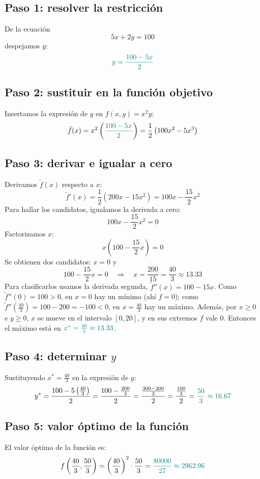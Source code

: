 \documentclass{article}
\begin{document}
\subsection*{Paso 1: resolver la restricción}
De la ecuación
\[
5x+2y=100
\]
despejamos \(y\):
\[\color{teal}
y=\frac{100-5x}{2}
\]
 
\subsection*{Paso 2: sustituir en la función objetivo}
Insertamos la expresión de \(y\) en \(f(x,y)=x^2y\):
\[
\tilde f(x)=x^2\left({\color{teal}\frac{100-5x}{2}}\right)=\frac{1}{2}\left(100x^2-5x^3\right)
\]
 
\subsection*{Paso 3: derivar e igualar a cero}
Derivamos \(\tilde f(x)\) respecto a \(x\):
\[
\tilde f'(x)=\frac{1}{2}\left(200x-15x^2\right)=100x-\frac{15}{2}x^2
\]
Para hallar los candidatos, igualamos la derivada a cero:
\[
100x-\frac{15}{2}x^2=0
\]
Factorizamos \(x\):
\[
x\left(100-\frac{15}{2}x\right)=0
\]
Se obtienen dos candidatos: \(x=0\) y
\[
100-\frac{15}{2}x=0 \quad\Longrightarrow\quad x=\frac{200}{15}=\frac{40}{3}\approx 13.33
\]
Para clasificarlos usamos la derivada segunda, \(\tilde f''(x)=100-15x\). Como \(\tilde f''(0)=100>0\), en \(x=0\) hay un mínimo (ahí \(f=0\)); como \(\tilde f''\!\left(\frac{40}{3}\right)=100-200=-100<0\), en \(x=\frac{40}{3}\) hay un máximo. Además, por \(x\geq 0\) e \(y\geq 0\), \(x\) se mueve en el intervalo \([0,20]\), y en sus extremos \(f\) vale \(0\). Entonces el máximo está en \(\color{teal}x^*=\frac{40}{3}\approx 13.33\).
 
\subsection*{Paso 4: determinar \(y\)}
Sustituyendo \(x^*=\frac{40}{3}\) en la expresión de \(y\):
\[
y^*=\frac{100-5\left(\frac{40}{3}\right)}{2}=\frac{100-\frac{200}{3}}{2}=\frac{\frac{300-200}{3}}{2}=\frac{\frac{100}{3}}{2}={\color{teal}\frac{50}{3}\approx 16.67}
\]
 
\subsection*{Paso 5: valor óptimo de la función}
El valor óptimo de la función es:
\[
f\left(\frac{40}{3},\frac{50}{3}\right)=\left(\frac{40}{3}\right)^2\cdot\frac{50}{3}={\color{teal}\frac{80000}{27}\approx 2962.96}
\]
 
\end{document}
